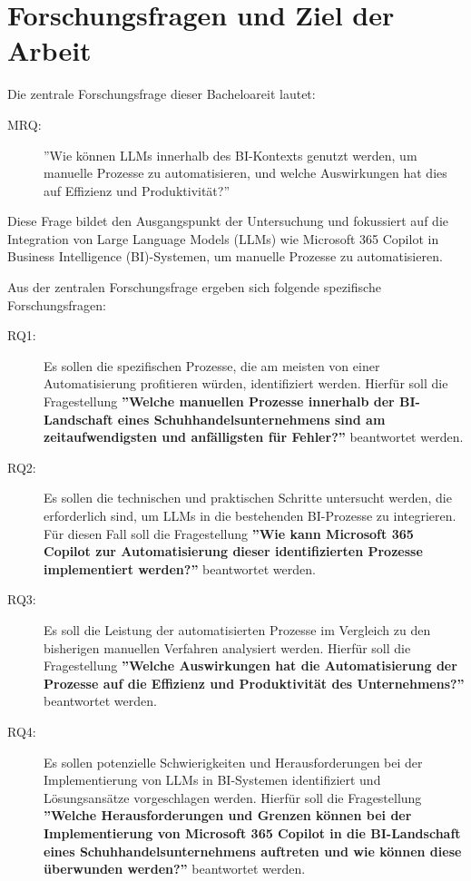 
\section{Forschungsfragen und Ziel der Arbeit}

Die zentrale Forschungsfrage dieser Bacheloareit lautet:

\begin{description}
    \item[MRQ:] ''Wie können LLMs innerhalb des BI-Kontexts genutzt werden, um manuelle Prozesse zu automatisieren, und welche Auswirkungen hat dies auf Effizienz und Produktivität?''
\end{description}
Diese Frage bildet den Ausgangspunkt der Untersuchung und fokussiert auf die Integration von Large Language Models (LLMs) wie Microsoft 365 Copilot in Business Intelligence (BI)-Systemen, um manuelle Prozesse zu automatisieren.

Aus der zentralen Forschungsfrage ergeben sich folgende spezifische Forschungsfragen:
\begin{description}
    \item[RQ1:] Es sollen die spezifischen Prozesse, die am meisten von einer Automatisierung profitieren würden, identifiziert werden. Hierfür soll die Fragestellung \textbf{''Welche manuellen Prozesse innerhalb der BI-Landschaft eines Schuhhandelsunternehmens sind am zeitaufwendigsten und anfälligsten für Fehler?''} beantwortet werden.
    \item[RQ2:] Es sollen die technischen und praktischen Schritte untersucht werden, die erforderlich sind, um LLMs in die bestehenden BI-Prozesse zu integrieren. Für diesen Fall soll die Fragestellung \textbf{''Wie kann Microsoft 365 Copilot zur Automatisierung dieser identifizierten Prozesse implementiert werden?''} beantwortet werden.
    \item[RQ3:] Es soll die Leistung der automatisierten Prozesse im Vergleich zu den bisherigen manuellen Verfahren analysiert werden. Hierfür soll die Fragestellung \textbf{''Welche Auswirkungen hat die Automatisierung der Prozesse auf die Effizienz und Produktivität des Unternehmens?''} beantwortet werden. 
    \item[RQ4:] Es sollen potenzielle Schwierigkeiten und Herausforderungen bei der Implementierung von LLMs in BI-Systemen identifiziert und Lösungsansätze vorgeschlagen werden. Hierfür soll die Fragestellung \textbf{''Welche Herausforderungen und Grenzen können bei der Implementierung von Microsoft 365 Copilot in die BI-Landschaft eines Schuhhandelsunternehmens auftreten und wie können diese überwunden werden?''} beantwortet werden. 
\end{description}

